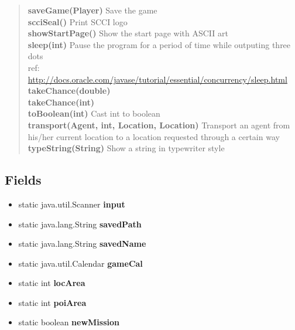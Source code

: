 {{{{{{\begin{verse}
{\bf saveGame(Player)} Save the game\\
{\bf scciSeal()} Print SCCI logo\\
{\bf showStartPage()} Show the start page with ASCII art\\
{\bf sleep(int)} Pause the program for a period of time while outputing three dots\\ref: \url{http://docs.oracle.com/javase/tutorial/essential/concurrency/sleep.html}\\
{\bf takeChance(double)} \\
{\bf takeChance(int)} \\
{\bf toBoolean(int)} Cast int to boolean\\
{\bf transport(Agent, int, Location, Location)} Transport an agent from his/her current location to a location requested through a certain way\\
{\bf typeString(String)} Show a string in typewriter style\\
\end{verse}
}
\subsection{Fields}{
\begin{itemize}
\item{
\label{personOfInterest.Game.input}static java.util.Scanner {\bf  input}
}
\item{
\label{personOfInterest.Game.savedPath}static java.lang.String {\bf  savedPath}
}
\item{
\label{personOfInterest.Game.savedName}static java.lang.String {\bf  savedName}
}
\item{
\label{personOfInterest.Game.gameCal}static java.util.Calendar {\bf  gameCal}
}
\item{
\label{personOfInterest.Game.locArea}static int {\bf  locArea}}
\item{
\label{personOfInterest.Game.poiArea}static int {\bf  poiArea}}
\item{
\label{personOfInterest.Game.newMission}static boolean {\bf  newMission}
}
\end{itemize}
}
}}}}}
